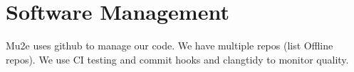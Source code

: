 \section{Software Management}
\label{sec:codemanagement}
Mu2e uses github to manage our code.  We have multiple repos (list Offline repos).  We use CI testing and commit hooks and clangtidy to monitor quality.
